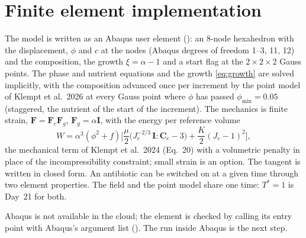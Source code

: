 \documentclass[11pt,a4paper]{article}
\begin{document}
\section{Finite element implementation}
\label{sec:fem}

The model is written as an Abaqus user element (): an 8-node
hexahedron with the displacement, $\phi$ and $c$ at the nodes (Abaqus degrees of freedom 1--3, 11,
12) and the composition, the growth $\xi=\alpha-1$ and a start flag at the $2\times2\times2$ Gauss
points. The phase and nutrient equations and the growth \eqref{eq:growth} are solved implicitly,
with the composition advanced once per increment by the point model of Klempt et al.\ 2026 at every
Gauss point where $\phi$ has passed $\phi_{\min}=0.05$ (staggered, the nutrient of the start of the
increment). The mechanics is finite strain, $\mathbf F=\mathbf F_e\mathbf F_g$,
$\mathbf F_g=\alpha\mathbf I$, with the energy per reference volume
\[W=\alpha^3(\phi^2+f)\Big[\frac{\mu}{2}\big(J_e^{-2/3}\,\mathbf I:\mathbf C_e-3\big)+\frac K2(J_e-1)^2\Big],\]
the mechanical term of Klempt et al.\ 2024 (Eq.~20) with a volumetric penalty in place of the
incompressibility constraint; small strain is an option. The tangent is written in closed form.
An antibiotic can be switched on at a given time through two element properties. The field and the
point model share one time: $T^*=1$ is Day~21 for both.

Abaqus is not available in the cloud; the element is checked by calling its entry point with
Abaqus's argument list (). The run inside Abaqus is the next step.
\end{document}
